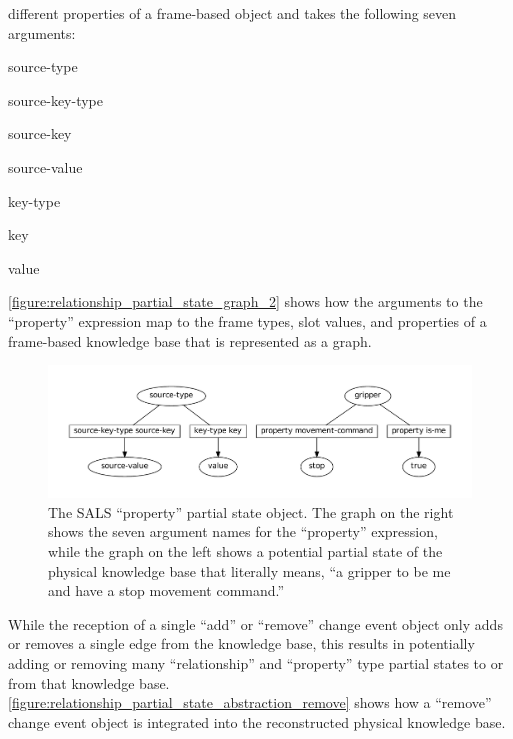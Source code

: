 different properties of a frame-based object and takes the following
seven arguments:
\begin{packed_enumerate}
\item{source-type}
\item{source-key-type}
\item{source-key}
\item{source-value}
\item{key-type}
\item{key}
\item{value}
\end{packed_enumerate}
{\mbox{\autoref{figure:relationship_partial_state_graph_2}}} shows how
the arguments to the ``property'' expression map to the frame types,
slot values, and properties of a frame-based knowledge base that is
represented as a graph.
\begin{figure}
\centering
\includegraphics[width=12cm]{gfx/property_partial_state_graph}
\caption[The SALS ``property'' partial state object.]{The SALS
  ``property'' partial state object.  The graph on the right shows the
  seven argument names for the ``property'' expression, while the
  graph on the left shows a potential partial state of the physical
  knowledge base that literally means, ``a gripper to be me and have a
  stop movement command.''}
\label{figure:property_partial_state_graph_2}
\end{figure}
While the reception of a single ``add'' or ``remove'' change event
object only adds or removes a single edge from the knowledge base,
this results in potentially adding or removing many ``relationship''
and ``property'' type partial states to or from that knowledge base.
{\mbox{\autoref{figure:relationship_partial_state_abstraction_remove}}}
shows how a ``remove'' change event object is integrated into the
reconstructed physical knowledge base.
